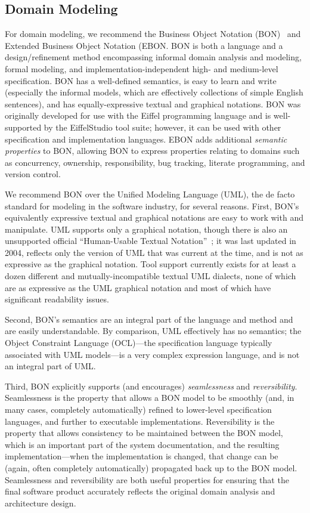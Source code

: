 \subsection{Domain Modeling}

For domain modeling, we recommend the Business Object Notation
(BON)~\cite{walden1995seamless} and Extended Business Object Notation
(EBON. BON is both a language and a design/refinement method
encompassing informal domain analysis and modeling, formal modeling,
and implementation-independent high- and medium-level
specification. BON has a well-defined semantics, is easy to learn and
write (especially the informal models, which are effectively
collections of simple English sentences), and has equally-expressive
textual and graphical notations. BON was originally developed for use
with the Eiffel programming language and is well-supported by the
EiffelStudio tool suite; however, it can be used with other
specification and implementation languages. EBON adds additional
\emph{semantic properties} to BON, allowing BON to express properties
relating to domains such as concurrency, ownership, responsibility,
bug tracking, literate programming, and version control.

We recommend BON over the Unified Modeling Language (UML), the de
facto standard for modeling in the software industry, for several
reasons. First, BON's equivalently expressive textual and graphical
notations are easy to work with and manipulate. UML supports only a
graphical notation, though there is also an unsupported official
``Human-Usable Textual Notation''~\cite{HUTN}; it was last updated in
2004, reflects only the version of UML that was current at the time,
and is not as expressive as the graphical notation. Tool support
currently exists for at least a dozen different and
mutually-incompatible textual UML dialects, none of which are as
expressive as the UML graphical notation and most of which have
significant readability issues.

Second, BON's semantics are an integral part of the language and
method and are easily understandable. By comparison, UML effectively
has no semantics; the Object Constraint Language (OCL)---the
specification language typically associated with UML models---is a
very complex expression language, and is not an integral part of UML.

Third, BON explicitly supports (and encourages) \emph{seamlessness}
and \emph{reversibility}. Seamlessness is the property that allows a
BON model to be smoothly (and, in many cases, completely
automatically) refined to lower-level specification languages, and
further to executable implementations. Reversibility is the property
that allows consistency to be maintained between the BON model, which
is an important part of the system documentation, and the resulting
implementation---when the implementation is changed, that change can
be (again, often completely automatically) propagated back up to the
BON model. Seamlessness and reversibility are both useful properties
for ensuring that the final software product accurately reflects the
original domain analysis and architecture design.

